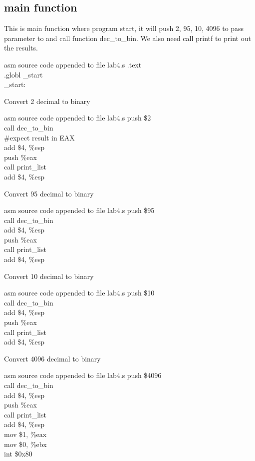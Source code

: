 \documentclass{article}
\begin{document}
\subsection{main function}
This is main function where program start, it will push 2, 95, 10, 4096 to pass parameter to and call function dec\_to\_bin. We also need call printf to print out the results. 
\begin{GFT}{asm source code appended to file lab4.s}
\+.text\\
\+.globl \_start\\
\+\_start:\\
\end{GFT}
\begin{multicols}{2}
Convert 2 decimal to binary
\begin{GFT}{asm source code appended to file lab4.s}
\+  push \$2\\
\+  call dec\_to\_bin		\\
\+\#expect result in EAX\\
\+  add \$4, \%esp\\
\+  push \%eax\\
\+  call print\_list\\
\+  add \$4, \%esp\\
\end{GFT}
\columnbreak
Convert 95 decimal to binary
\begin{GFT}{asm source code appended to file lab4.s}
\+  push \$95\\
\+  call dec\_to\_bin		\\
\+  add \$4, \%esp\\
\+  push \%eax\\
\+  call print\_list\\
\+  add \$4, \%esp\\
\end{GFT}
\end{multicols}
\pagebreak
\begin{multicols}{2}
Convert 10 decimal to binary
\begin{GFT}{asm source code appended to file lab4.s}
\+push \$10\\
\+  call dec\_to\_bin		\\
\+  add \$4, \%esp\\
\+  push \%eax\\
\+  call print\_list\\
\+  add \$4, \%esp\\
\end{GFT}
\columnbreak
Convert 4096 decimal to binary
\begin{GFT}{asm source code appended to file lab4.s}
\+push \$4096\\
\+  call dec\_to\_bin		\\
\+  add \$4, \%esp\\
\+  push \%eax\\
\+  call print\_list\\
\+  add \$4, \%esp\\
\+  mov \$1, \%eax\\
\+  mov \$0, \%ebx\\
\+  int \$0x80\\
\end{GFT}
\end{multicols}
\end{document}
